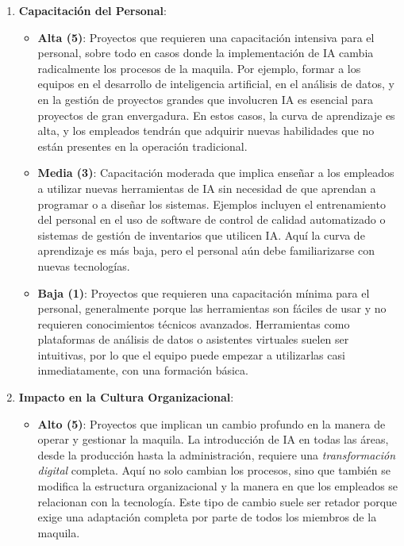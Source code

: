 \begin{enumerate}
    \item \textbf{Capacitación del Personal}:
    \begin{itemize}
        \item \textbf{Alta (5)}: Proyectos que requieren una capacitación intensiva para el personal, sobre todo en casos donde la implementación de IA cambia radicalmente los procesos de la maquila. Por ejemplo, formar a los equipos en el desarrollo de inteligencia artificial, en el análisis de datos, y en la gestión de proyectos grandes que involucren IA es esencial para proyectos de gran envergadura. En estos casos, la curva de aprendizaje es alta, y los empleados tendrán que adquirir nuevas habilidades que no están presentes en la operación tradicional.
        
        \item \textbf{Media (3)}: Capacitación moderada que implica enseñar a los empleados a utilizar nuevas herramientas de IA sin necesidad de que aprendan a programar o a diseñar los sistemas. Ejemplos incluyen el entrenamiento del personal en el uso de software de control de calidad automatizado o sistemas de gestión de inventarios que utilicen IA. Aquí la curva de aprendizaje es más baja, pero el personal aún debe familiarizarse con nuevas tecnologías.
        
        \item \textbf{Baja (1)}: Proyectos que requieren una capacitación mínima para el personal, generalmente porque las herramientas son fáciles de usar y no requieren conocimientos técnicos avanzados. Herramientas como plataformas de análisis de datos o asistentes virtuales suelen ser intuitivas, por lo que el equipo puede empezar a utilizarlas casi inmediatamente, con una formación básica.
    \end{itemize}

    \item \textbf{Impacto en la Cultura Organizacional}:
    \begin{itemize}
        \item \textbf{Alto (5)}: Proyectos que implican un cambio profundo en la manera de operar y gestionar la maquila. La introducción de IA en todas las áreas, desde la producción hasta la administración, requiere una \textit{transformación digital} completa. Aquí no solo cambian los procesos, sino que también se modifica la estructura organizacional y la manera en que los empleados se relacionan con la tecnología. Este tipo de cambio suele ser retador porque exige una adaptación completa por parte de todos los miembros de la maquila.
        

\end{itemize}
\end{enumerate}
